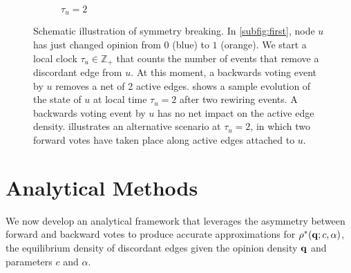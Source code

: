 \documentclass[review, onefignum, onetabnum]{siamart171218}
\begin{document}
\begin{figure}
\begin{subfigure}{.3\textwidth}
				\caption{$\tau_u = 2$}\label{subfig:third}
			\end{subfigure}
			\caption{
				Schematic illustration of symmetry breaking.
				In \cref{subfig:first},  node $u$ has just changed opinion from $0$ (blue) to $1$ (orange). 
				We start a local clock $\tau_u \in \mathbb{Z}_+$ that counts the number of events that remove a discordant edge from $u$. 
				At this moment, a backwards voting event by $u$ removes a net of 2 active edges.  
				 shows a sample evolution of the state of $u$ at local time $\tau_u = 2$ after two rewiring events. 
				A backwards voting event by $u$ has no net impact on the active edge density. 
				 illustrates an alternative scenario at $\tau_u = 2$, in which two forward votes have taken place along active edges attached to $u$. 
				}\label{fig:breaking_illustration}
		\end{figure}

\section{Analytical Methods} \label{sec:analytic}
	We now develop an analytical framework that leverages the asymmetry between forward and backward votes to produce accurate approximations for $\rho^*(\mathbf{q}; c, \alpha)$, the equilibrium density of discordant edges given the opinion density $\mathbf{q}$ and parameters $c$ and $\alpha$. 
\end{document}
